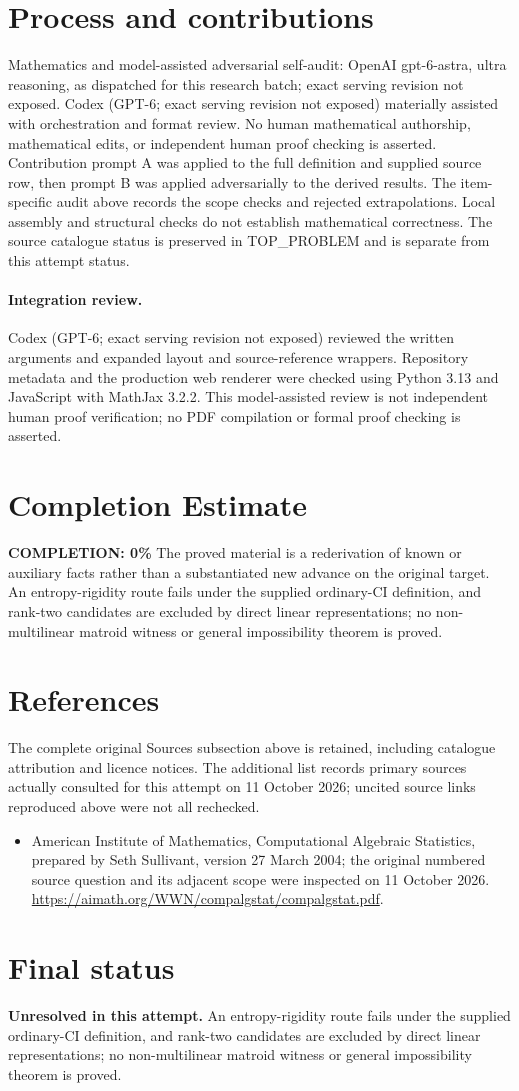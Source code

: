 \documentclass[11pt]{article}
\begin{document}
\section{Process and contributions}
Mathematics and model-assisted adversarial self-audit: OpenAI gpt-6-astra, ultra reasoning, as dispatched for this research batch; exact serving revision not exposed. Codex (GPT-6; exact serving revision not exposed) materially assisted with orchestration and format review. No human mathematical authorship, mathematical edits, or independent human proof checking is asserted.
Contribution prompt A was applied to the full definition and supplied source row, then prompt B was applied adversarially to the derived results. The item-specific audit above records the scope checks and rejected extrapolations. Local assembly and structural checks do not establish mathematical correctness. The source catalogue status is preserved in TOP\_PROBLEM and is separate from this attempt status.
\paragraph{Integration review.} Codex (GPT-6; exact serving revision not exposed) reviewed the written arguments and expanded layout and source-reference wrappers. Repository metadata and the production web renderer were checked using Python 3.13 and JavaScript with MathJax 3.2.2. This model-assisted review is not independent human proof verification; no PDF compilation or formal proof checking is asserted.

\section{Completion Estimate}
\noindent\textbf{COMPLETION: 0\%}
The proved material is a rederivation of known or auxiliary facts rather than a substantiated new advance on the original target. An entropy-rigidity route fails under the supplied ordinary-CI definition, and rank-two candidates are excluded by direct linear representations; no non-multilinear matroid witness or general impossibility theorem is proved.
\section{References}
The complete original Sources subsection above is retained, including catalogue attribution and licence notices. The additional list records primary sources actually consulted for this attempt on 11 October 2026; uncited source links reproduced above were not all rechecked.
\begin{itemize}
\item American Institute of Mathematics, Computational Algebraic Statistics, prepared by Seth Sullivant, version 27 March 2004; the original numbered source question and its adjacent scope were inspected on 11 October 2026. \url{https://aimath.org/WWN/compalgstat/compalgstat.pdf}.
\end{itemize}
\section{Final status}
\textbf{Unresolved in this attempt.} An entropy-rigidity route fails under the supplied ordinary-CI definition, and rank-two candidates are excluded by direct linear representations; no non-multilinear matroid witness or general impossibility theorem is proved.
\end{document}
